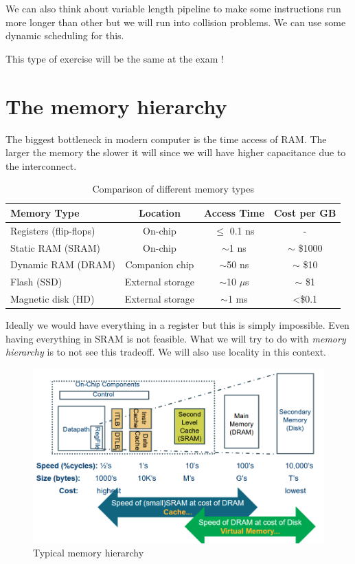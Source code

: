 \documentclass{report}
\begin{document}
We can also think about variable length pipeline to make some instructions run more longer than other but we will run into collision problems. We can use some dynamic scheduling for this.

This type of exercise will be the same at the exam !
\chapter{The memory hierarchy}

The biggest bottleneck in modern computer is the time access of RAM. The larger the memory the slower it will since we will have higher capacitance due to the interconnect.

\begin{table}[h]
    \centering
    \begin{tabular}{lccc}
        \toprule
        \textbf{Memory Type} & \textbf{Location} & \textbf{Access Time} & \textbf{Cost per GB} \\
        \midrule
        Registers (flip-flops) & On-chip & $\leq$ 0.1 ns & - \\
        Static RAM (SRAM) & On-chip & $\sim$1 ns & $\sim$ \$1000 \\
        Dynamic RAM (DRAM) & Companion chip & $\sim$50 ns & $\sim$ \$10 \\
        Flash (SSD) & External storage & $\sim$10 $\mu$s & $\sim$ \$1 \\
        Magnetic disk (HD) & External storage & $\sim$1 ms & <\$0.1 \\
        \bottomrule
    \end{tabular}
    \caption{Comparison of different memory types}
    \label{tab:memory_comparison}
\end{table}

Ideally we would have everything in a register but this is simply impossible. Even having everything in SRAM is not feasible. What we will try to do with \textit{memory hierarchy} is to not see this tradeoff. We will also use locality in this context.

\begin{figure}[H]
    \centering
    \includegraphics[width=0.75\linewidth]{Typical_memory.png}
    \caption{Typical memory hierarchy}
    \label{fig:enter-label}
\end{figure}
\end{document}
